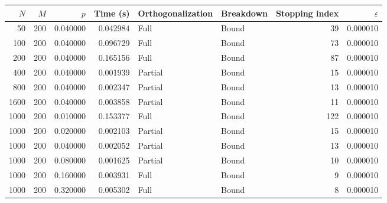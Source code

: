 \begin{tabular}{rrrrllrr}
\toprule
$N$ & $M$ & $p$ & Time (s)& Orthogonalization & Breakdown & Stopping index & $\varepsilon$ \\
\midrule
50 & 200 & 0.040000 & 0.042984 & Full & Bound & 39 & 0.000010 \\
100 & 200 & 0.040000 & 0.096729 & Full & Bound & 73 & 0.000010 \\
200 & 200 & 0.040000 & 0.165156 & Full & Bound & 87 & 0.000010 \\
400 & 200 & 0.040000 & 0.001939 & Partial & Bound & 15 & 0.000010 \\
800 & 200 & 0.040000 & 0.002347 & Partial & Bound & 13 & 0.000010 \\
1600 & 200 & 0.040000 & 0.003858 & Partial & Bound & 11 & 0.000010 \\
\bottomrule
\toprule
1000 & 200 & 0.010000 & 0.153377 & Full & Bound & 122 & 0.000010 \\
1000 & 200 & 0.020000 & 0.002103 & Partial & Bound & 15 & 0.000010 \\
1000 & 200 & 0.040000 & 0.002052 & Partial & Bound & 13 & 0.000010 \\
1000 & 200 & 0.080000 & 0.001625 & Partial & Bound & 10 & 0.000010 \\
1000 & 200 & 0.160000 & 0.003931 & Full & Bound & 9 & 0.000010 \\
1000 & 200 & 0.320000 & 0.005302 & Full & Bound & 8 & 0.000010 \\
\bottomrule
\end{tabular}
